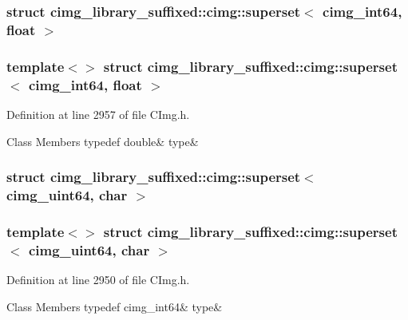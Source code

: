 \subsubsection{struct cimg\+\_\+library\+\_\+suffixed\+:\+:cimg\+:\+:superset$<$ cimg\+\_\+int64, float $>$}
\subsubsection*{template$<$$>$\newline
struct cimg\+\_\+library\+\_\+suffixed\+::cimg\+::superset$<$ cimg\+\_\+int64, float $>$}



Definition at line 2957 of file C\+Img.\+h.

\begin{DoxyFields}{Class Members}
\mbox{\label{namespacecimg__library__suffixed_1_1cimg_a7e72ede1380d85f601c52ce0d4e3baa5}} 
typedef double&
type&
\\
\hline

\end{DoxyFields}
\label{structcimg__library__suffixed_1_1cimg_1_1superset_3_01cimg__uint64_00_01char_01_4}
\subsubsection{struct cimg\+\_\+library\+\_\+suffixed\+:\+:cimg\+:\+:superset$<$ cimg\+\_\+uint64, char $>$}
\subsubsection*{template$<$$>$\newline
struct cimg\+\_\+library\+\_\+suffixed\+::cimg\+::superset$<$ cimg\+\_\+uint64, char $>$}



Definition at line 2950 of file C\+Img.\+h.

\begin{DoxyFields}{Class Members}
\mbox{\label{namespacecimg__library__suffixed_1_1cimg_a0da6f18678959c893e087b2f3b6f09b3}} 
typedef cimg\_int64&
type&
\\
\hline

\end{DoxyFields}
\label{structcimg__library__suffixed_1_1cimg_1_1superset_3_01cimg__uint64_00_01cimg__int64_01_4}
